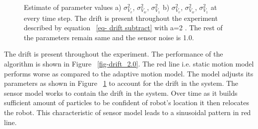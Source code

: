\documentclass[12pt]{dalcsthesis}
\begin{document}
   
\begin{figure}[!ht]
  \centering
  \caption{\label{fig-drift_motion_model_1.0_trans} Estimate of parameter values a) $\sigma_{V_{v}}^{2}$, $\sigma_{V_{w}}^{2}$,  $\sigma_{V_{1}}^{2}$ b) $\sigma_{V_{v}}^{2}$, $\sigma_{V_{w}}^{2}$,  $\sigma_{V_{1}}^{2}$ at every time step. The drift is present throughout the experiment described by equation ~\ref{eq- drift subtract} with a=2 . The rest of the parameters remain same and the sensor noise is 1.0.}
\end{figure}

The drift is present throughout the experiment. The performance of the algorithm is shown in Figure ~\ref{fig-drift_2.0}. The red line i.e. static motion model performs worse as compared to the adaptive motion model. The model adjusts its parameters as shown in Figure ~\ref{fig-drift_motion_model_1.0_trans} to account for the drift in the system. The sensor model works to contain the drift in the system. Over time as it builds sufficient amount of particles to be confident of robot's location it then relocates the robot. This characteristic of sensor model leads to a sinusoidal pattern in red line.  
\end{document}
